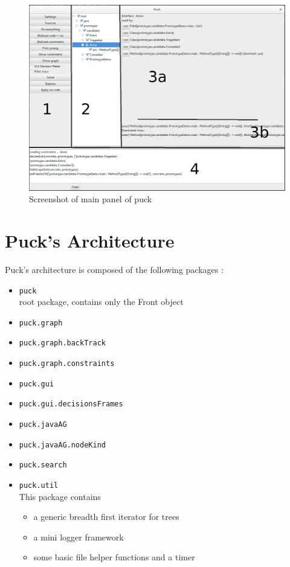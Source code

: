 \documentclass[]{article}
\begin{document}
\begin{figure}
\centerline{\includegraphics[keepaspectratio, width=1.7\textwidth]{screenshot.png}}
\caption{Screenshot of main panel of puck}
\label{fig:screenshot}
\end{figure}
 
\section{Puck's Architecture}
Puck's architecture is composed of the following packages : 
\begin{itemize}
\item \verb|puck|\\
	root package, contains only the Front object
\item \verb|puck.graph|
\item \verb|puck.graph.backTrack|
\item \verb|puck.graph.constraints|
\item \verb|puck.gui|
\item \verb|puck.gui.decisionsFrames|
\item \verb|puck.javaAG|
\item \verb|puck.javaAG.nodeKind|
\item \verb|puck.search|
\item \verb|puck.util|\\
This package contains 
\begin{itemize}
\item a generic breadth first iterator for trees
\item a mini logger framework
\item some basic file helper functions and a timer
\end{itemize}

\end{itemize}
\end{document}
